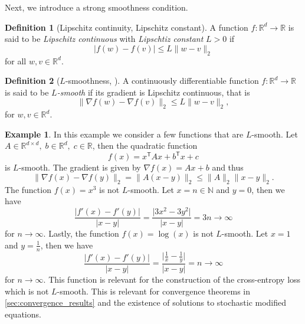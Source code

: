 \documentclass[12pt]{article}
\theoremstyle{definition}
\newtheorem{example}[example]{Example}
\newtheorem{definition}[definition]{Definition}
\numberwithin{equation}{section}
\newcommand{\N}{\mathbb{N}}
\newcommand{\R}{\mathbb{R}}
\newcommand{\T}{\mathsf{T}}
\newcommand{\norm}[1]{\lVert{#1}\rVert_2}
\begin{document}
Next, we introduce a strong smoothness condition.
\begin{definition}[Lipschitz continuity, Lipschitz constant]
  \label{def:lipschitz_continuity}
  A function $f : \R^d \rightarrow \R$ is said to be \emph{Lipschitz continuous} with \emph{Lipschtiz constant} $L >0$ if
  \begin{equation*}
    |f(w) - f(v)| \leq L \norm{w - v}
  \end{equation*}
  for all $w,v \in \R^d$.
\end{definition}
\begin{definition}[$L$-smoothness, ]
  \label{def:l_smooth}
  A continuously differentiable function $f : \mathbb{R}^d \rightarrow \mathbb{R}$ is said to be \emph{$L$-smooth} if its gradient is Lipschitz continuous, that is 
  \begin{equation}
    \norm{\nabla f(w) - \nabla f(v) } \leq L \norm{w-v},
  \end{equation}
  for $w,v \in \mathbb{R}^d$.
\end{definition}
\begin{example}
  In this example we consider a few functions that are $L$-smooth. 
  Let $A \in \R^{d \times d},\; b \in \R^d,\; c \in \R$, then the quadratic function
  \begin{equation*}
    f(x) = x^\T A x + b^\T x + c
  \end{equation*}
  is $L$-smooth. The gradient is given by $\nabla f(x)  = Ax + b$ and thus
  \begin{equation*}
    \norm{\nabla f(x) - \nabla f(y)} = \norm{A(x-y)} \leq \norm{A} \norm{x-y}.
  \end{equation*}
  The function $f(x) = x^3$ is not $L$-smooth. Let $x = n \in \N$ and $y = 0$, then we have
  \begin{equation*}
    \frac{\lvert f'(x) - f'(y) \rvert}{\lvert x - y \rvert} = \frac{\lvert3x^2 - 3 y^2 \rvert}{\lvert x-y \rvert} = 3n \rightarrow \infty
  \end{equation*}
  for $n \rightarrow \infty$.
  Lastly, the function $f(x) = \log(x)$ is not $L$-smooth. Let $x = 1$ and $y = \frac{1}{n}$, then we have
  \begin{equation*}
    \frac{\lvert f'(x) - f'(y) \rvert}{\lvert x - y \rvert} = \frac{\lvert \frac{1}{x}- \frac{1}{y} \rvert}{\lvert x-y \rvert} = n \rightarrow \infty
  \end{equation*}
  for $n \rightarrow \infty$. This function is relevant for the construction of the cross-entropy loss which is not $L$-smooth. This is relevant for convergence theorems in \autoref{sec:convergence_results} and the existence of solutions to stochastic modified equations.
\end{example}
\end{document}
